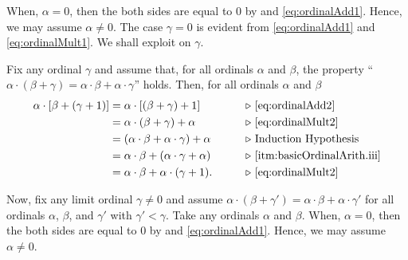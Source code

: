 \documentclass[../introduction_to_set_theory_Note.tex]{subfiles}
\begin{document}
{    

    When, \(\alpha = 0\), then the both sides are equal to \(0\) by
     and \eqref{eq:ordinalAdd1}.
    Hence, we may assume \(\alpha \neq 0\).
    The case \(\gamma = 0\) is evident from
    \eqref{eq:ordinalAdd1} and \eqref{eq:ordinalMult1}.
    We shall exploit  on \(\gamma\).

    Fix any ordinal \(\gamma\) and assume that,
    for all ordinals \(\alpha\) and \(\beta\),
    the property ``\(\alpha \cdot (\beta + \gamma) = \alpha \cdot \beta + \alpha \cdot \gamma\)''
    holds. Then, for all ordinals \(\alpha\) and \(\beta\)
    \begin{alignat*}{2}
        \alpha \cdot [\beta + (\gamma + 1)]
        &= \alpha \cdot [(\beta + \gamma) + 1] &\qquad& \comment*{\eqref{eq:ordinalAdd2}} \\
        &= \alpha \cdot (\beta + \gamma) + \alpha && \comment*{\eqref{eq:ordinalMult2}} \\
        &= (\alpha \cdot \beta + \alpha \cdot \gamma) + \alpha && \comment*{Induction Hypothesis} \\
        &= \alpha \cdot \beta + (\alpha \cdot \gamma + \alpha) && \comment*{\ref{itm:basicOrdinalArith.iii}} \\
        &= \alpha \cdot \beta + \alpha \cdot (\gamma + 1). && \comment*{\eqref{eq:ordinalMult2}}
    \end{alignat*}

    Now, fix any limit ordinal \(\gamma \neq 0\) and assume
    \(\alpha \cdot (\beta + \gamma') = \alpha \cdot \beta + \alpha \cdot \gamma'\)
    for all ordinals \(\alpha\), \(\beta\), and \(\gamma'\) with \(\gamma' < \gamma\).
    Take any ordinals \(\alpha\) and \(\beta\).
    When, \(\alpha = 0\), then the both sides are equal to \(0\) by
     and \eqref{eq:ordinalAdd1}.
    Hence, we may assume \(\alpha \neq 0\).

}
\end{document}
